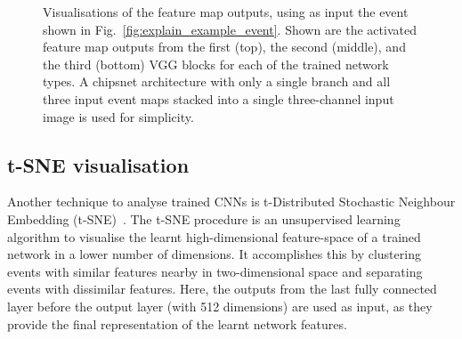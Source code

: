 \begin{figure}
{    }
    \quad
    \caption[Visualisations of trained feature map outputs]
    {Visualisations of the feature map outputs, using as input the event shown in
        Fig.~\ref{fig:explain_example_event}. Shown are the activated feature map outputs from the
        first (top), the second (middle), and the third (bottom) VGG blocks for each of the
        trained network types. A chipsnet architecture with only a single branch and all three
        input event maps stacked into a single three-channel input image is used for simplicity.}
    \label{fig:cnn_visualisations}
\end{figure}

\subsection{t-SNE visualisation} %
\label{sec:results_explain_tsne} %

Another technique to analyse trained CNNs is t-Distributed Stochastic Neighbour Embedding
(t-SNE)~\cite{maaten2008}. The t-SNE procedure is an unsupervised learning algorithm to visualise
the learnt high-dimensional feature-space of a trained network in a lower number of dimensions. It
accomplishes this by clustering events with similar features nearby in two-dimensional space and
separating events with dissimilar features. Here, the outputs from the last fully connected layer
before the output layer (with 512 dimensions) are used as input, as they provide the final
representation of the learnt network features.

